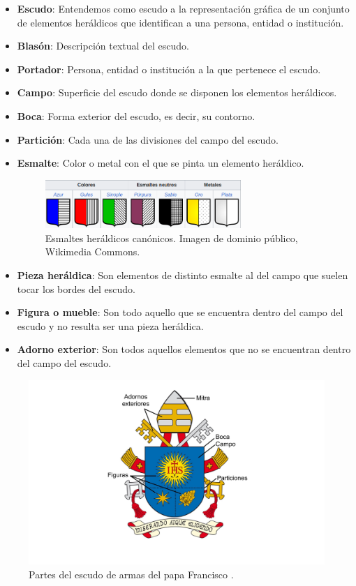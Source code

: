 \begin{itemize}
    \item \textbf{Escudo}: Entendemos como escudo a la representación gráfica de un conjunto de
    elementos heráldicos que identifican a una persona, entidad o institución.
    \item \textbf{Blasón}: Descripción textual del escudo.
    \item \textbf{Portador}: Persona, entidad o institución a la que pertenece el escudo.
    \item \textbf{Campo}: Superficie del escudo donde se disponen los elementos heráldicos.
    \item \textbf{Boca}: Forma exterior del escudo, es decir, su contorno.
    \item \textbf{Partición}: Cada una de las divisiones del campo del escudo. 
    \item \textbf{Esmalte}: Color o metal con el que se pinta un elemento heráldico.
    \begin{figure}[H]
        \centering
        \includegraphics[width=0.7\textwidth]{figuras/esmaltes-canonicos.png}
        \caption{Esmaltes heráldicos canónicos. Imagen de dominio público, Wikimedia Commons.}
        \label{fig:esmaltes}
    \end{figure}
    \item \textbf{Pieza heráldica}: Son elementos de distinto esmalte al del campo que suelen tocar
    los bordes del escudo.
    \item \textbf{Figura o mueble}: Son todo aquello que se encuentra dentro del campo del escudo y
    no resulta ser una pieza heráldica.
    \item \textbf{Adorno exterior}: Son todos aquellos elementos que no se encuentran dentro del campo
    del escudo.
\end{itemize}

\begin{figure}[H]
    \centering
    \includegraphics[width=1\textwidth]{figuras/escudo-papa-francisco.png}
    \caption{Partes del escudo de armas del papa Francisco \cite{wikiEscudo}.}
    \label{fig:partes-escudo}
\end{figure}

